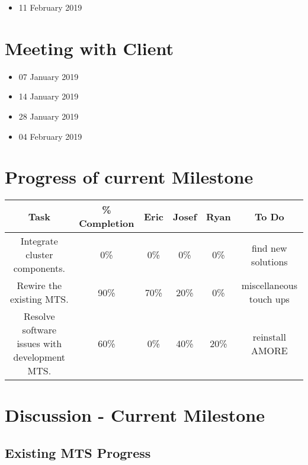 \documentclass[12pt]{article}
\begin{document}
\begin{itemize}
	\item 11 February 2019
\end{itemize}
\section{Meeting with Client}

\begin{itemize}
\item 07 January 2019
\item 14 January 2019
\item 28 January 2019
\item 04 February 2019
\end{itemize}

\section{Progress of current Milestone}

\begin{adjustwidth}{-3.5cm}{}
  \begin{center}
    \begin{tabular}{|c|c|c|c|c|c|}
      \hline
      Task & \% Completion & Eric & Josef & Ryan & To Do \\
      \hline
      Integrate cluster components. & 0\% & 0\% & 0\% & 0\% & find new solutions \\
      Rewire the existing MTS. & 90\% & 70\% & 20\% & 0\% & miscellaneous touch ups \\
      Resolve software issues with development MTS. & 60\% & 0\% & 40\% & 20\% &
                                                                                 reinstall
                                                                                 AMORE
      \\
      \hline   
    \end{tabular}
  \end{center}
\end{adjustwidth}

\section{Discussion - Current Milestone}

\subsection{Existing MTS Progress}
\end{document}
